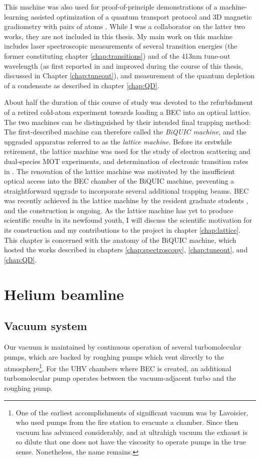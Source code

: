 	This machine was also used for proof-of-principle demonstrations of a machine-learning assisted optimization of a quantum transport protocol \cite{Henson18_ML} and 3D magnetic gradiometry with pairs of atoms \cite{Shin20}.
	While I was a collaborator on the latter two works, they are not included in this thesis.
	My main work on this machine includes laser spectroscopic measurements of several transition energies \cite{Ross20,Thomas20} (the former constituting chapter \ref{chap:transitions}) and of the 413nm tune-out wavelength (as first reported in \cite{Henson15} and improved during the course of this thesis, discussed in Chapter \ref{chap:tuneout}), and measurement of the quantum depletion of a condensate as described in chapter \ref{chap:QD}.
	

	About half the duration of this course of study was devoted to the refurbishment of a retired cold-atom experiment towards loading a \mhe BEC into an optical lattice.
	The two machines can be distinguished by their intended final trapping method: The first-described machine can therefore called the \emph{BiQUIC machine}, and the upgraded apparatus referred to as the \emph{lattice machine}.
	Before its erstwhile retirement, the lattice machine was used for the study of electron scattering and  dual-species MOT experiments\cite{Uhlmann05,Byron10,Byron10a}, and determination of electronic transition rates \cite{Hodgman09_23P} in \mhe.
	The renovation of the lattice machine was motivated by the insufficient optical access into the BEC chamber of the BiQUIC machine, preventing a straightforward upgrade to incorporate several additional trapping beams.
	BEC was recently achieved in the lattice machine by the resident graduate students \cite{Abbas21}, and the construction is ongoing.
	As the lattice machine has yet to produce scientific results in its newfound youth, I will discuss the scientific motivation for its construction and my contributions to the project in chapter \ref{chap:lattice}.
	This chapter is concerned with the anatomy of the BiQUIC machine, which hosted the works described in chapters \ref{chap:spectroscopy}, \ref{chap:tuneout}, and \ref{chap:QD}.

\section{Helium beamline}

\subsection{Vacuum system}
	Our vacuum is maintained by continuous operation of several turbomolecular pumps, which are backed by roughing pumps which vent directly to the atmosphere\footnote{One of the earliest accomplishments of significant vacuum was by Lavoisier, who used pumps from the fire station to evacuate a chamber.
	Since then vacuum has advanced considerably, and at ultrahigh vacuum the exhaust is so dilute that one does not have the viscosity to operate pumps in the true sense.
	Nonetheless, the name remains.}.
	For the UHV chambers where BEC is created, an additional turbomolecular pump operates between the vacuum-adjacent turbo and the roughing pump.
	

